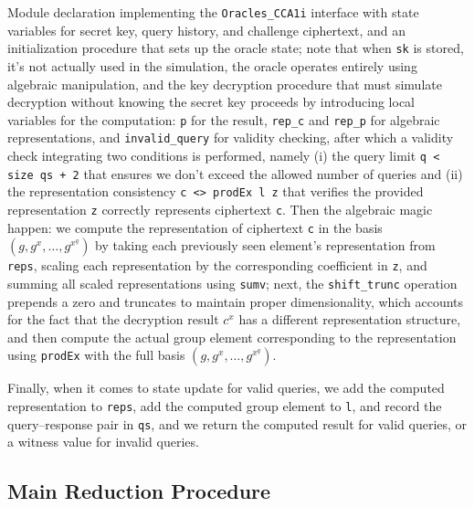 Module declaration implementing the \texttt{Oracles\_CCA1i} interface with state variables for secret key, query history, and challenge ciphertext, and an initialization procedure that sets up the oracle state; note that when \texttt{sk} is stored, it's not actually used in the simulation, the oracle operates entirely using algebraic manipulation, and the key decryption procedure that must simulate decryption without knowing the secret key proceeds by introducing local variables for the computation: \texttt{p} for the result, \texttt{rep\_c} and \texttt{rep\_p} for algebraic representations, and \texttt{invalid\_query} for validity checking, after which a validity check integrating two conditions is performed, namely (i) the query limit \texttt{q < size qs + 2} that ensures we don't exceed the allowed number of queries and (ii) the representation consistency \texttt{c <> prodEx l z} that verifies the provided representation \texttt{z} correctly represents ciphertext \texttt{c}. 
Then the algebraic magic happen: we compute the representation of ciphertext \texttt{c} in the basis \((g, g^x, \ldots, g^{x^q})\) by taking each previously seen element's representation from \texttt{reps}, scaling each representation by the corresponding coefficient in \texttt{z}, and summing all scaled representations using \texttt{sumv}; next, the \texttt{shift\_trunc} operation prepends a zero and truncates to maintain proper dimensionality, which accounts for the fact that the decryption result \(c^x\) has a different representation structure, and then compute the actual group element corresponding to the representation using \texttt{prodEx} with the full basis \((g, g^x, \ldots, g^{x^q})\). 

Finally, when it comes to state update for valid queries, we add the computed representation to \texttt{reps}, add the computed group element to \texttt{l}, and record the query--response pair in \texttt{qs}, and we return the computed result for valid queries, or a witness value for invalid queries.













\subsection{Main Reduction Procedure}

